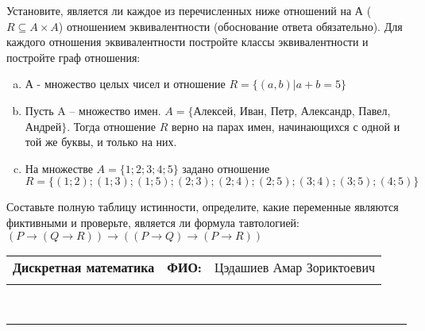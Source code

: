 \documentclass[10pt]{exam}
\newcommand{\class}{Дискретная математика}
\newcommand{\examdate}{}
\begin{document}
\begin{questions}
\question
Установите, является ли каждое из перечисленных ниже отношений на А ($R \subseteq A \times A$) отношением эквивалентности (обоснование ответа обязательно). Для каждого отношения эквивалентности постройте классы 
эквивалентности и постройте граф отношения:
\begin{enumerate} [a)]\setcounter{enumi}{0}
\item А - множество целых чисел и отношение $R = \{(a,b)|a + b = 5\}$
\item Пусть A – множество имен. $A = \{ $Алексей, Иван, Петр, Александр, Павел, Андрей$ \}$. Тогда отношение $R $ верно на парах имен, начинающихся с одной и той же буквы, и только на них.
\item На множестве $A = \{1; 2; 3; 4; 5\}$ задано отношение $R = \{(1; 2); (1; 3); (1; 5); (2; 3); (2; 4); (2; 5); (3; 4); (3; 5); (4; 5)\}$
\end{enumerate}\question Составьте полную таблицу истинности, определите, какие переменные являются фиктивными и проверьте, является ли формула тавтологией:
$(P \rightarrow (Q \rightarrow R)) \rightarrow ((P \rightarrow Q) \rightarrow (P \rightarrow R))$

\end{questions}
\newpage
\begin{flushright}
\begin{tabular}{p{2.8in} r l}
\textbf{\class} & \textbf{ФИО:} &Цэдашиев Амар Зориктоевич
\\

\textbf{\examdate} &&\\
\end{tabular}\\
\end{flushright}
\rule[1ex]{\textwidth}{.1pt}
\end{document}
